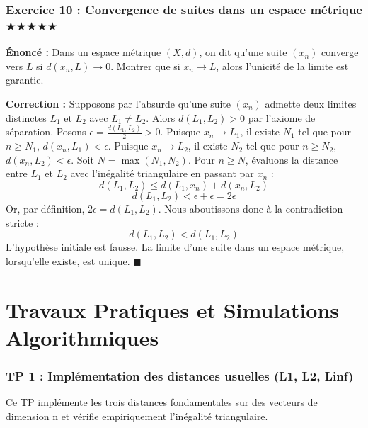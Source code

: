 \documentclass[11pt,a4paper]{article}
\begin{document}
\section*{Exercice 10 : Convergence de suites dans un espace métrique \quad $\bigstar\bigstar\bigstar\bigstar\bigstar$}

\textbf{Énoncé :}
Dans un espace métrique $(X, d)$, on dit qu'une suite $(x_n)$ converge vers $L$ si $d(x_n, L) \to 0$.
Montrer que si $x_n \to L$, alors l'unicité de la limite est garantie.

\textbf{Correction :}
Supposons par l'absurde qu'une suite $(x_n)$ admette deux limites distinctes $L_1$ et $L_2$ avec $L_1 \neq L_2$.
Alors $d(L_1, L_2) > 0$ par l'axiome de séparation. Posons $\epsilon = \frac{d(L_1, L_2)}{2} > 0$.
Puisque $x_n \to L_1$, il existe $N_1$ tel que pour $n \ge N_1$, $d(x_n, L_1) < \epsilon$.
Puisque $x_n \to L_2$, il existe $N_2$ tel que pour $n \ge N_2$, $d(x_n, L_2) < \epsilon$.
Soit $N = \max(N_1, N_2)$. Pour $n \ge N$, évaluons la distance entre $L_1$ et $L_2$ avec l'inégalité triangulaire en passant par $x_n$ :
$$ d(L_1, L_2) \le d(L_1, x_n) + d(x_n, L_2) $$
$$ d(L_1, L_2) < \epsilon + \epsilon = 2\epsilon $$
Or, par définition, $2\epsilon = d(L_1, L_2)$. Nous aboutissons donc à la contradiction stricte :
$$ d(L_1, L_2) < d(L_1, L_2) $$
L'hypothèse initiale est fausse. La limite d'une suite dans un espace métrique, lorsqu'elle existe, est unique. $\blacksquare$



\part{Travaux Pratiques et Simulations Algorithmiques}
\section*{TP 1 : Implémentation des distances usuelles (L1, L2, Linf)}

Ce TP implémente les trois distances fondamentales sur des vecteurs de dimension n et vérifie empiriquement l'inégalité triangulaire.
\end{document}
